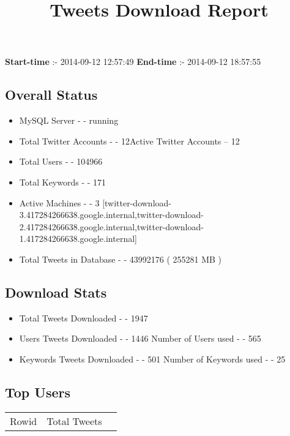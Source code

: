 \documentclass{article}\usepackage[T1]{fontenc}
\begin{document}
\title{\textbf{Tweets Download Report}}
               \date{}
                \maketitle
               \centerline{\textbf{Start-time} :- 2014-09-12 12:57:49 \hspace{40pt} \textbf{End-time} :- 2014-09-12 18:57:55}               \subsection*{Overall Status}                \begin{itemize}                \item MySQL Server - - running               \item Total Twitter Accounts - - 12\newline Active Twitter Accounts -- 12               \item Total Users - - 104966               \item Total Keywords - - 171               \item Active Machines - - 3 [twitter-download-3.417284266638.google.internal,twitter-download-2.417284266638.google.internal,twitter-download-1.417284266638.google.internal]               \item Total Tweets in Database - - 43992176 ( 255281 MB )               \end{itemize}               \subsection*{Download Stats}                \begin{itemize}                \item Total Tweets Downloaded - - 1947               \item Users Tweets Downloaded - - 1446 \newline Number of Users used - - 565               \item Keywords Tweets Downloaded - - 501 \newline Number of Keywords used - - 25              \end{itemize}              \subsection*{Top Users}\begin{tabular}{|c|c|c|}         \hline         Rowid & Total Tweets \\ 

\end{tabular}
\end{document}
